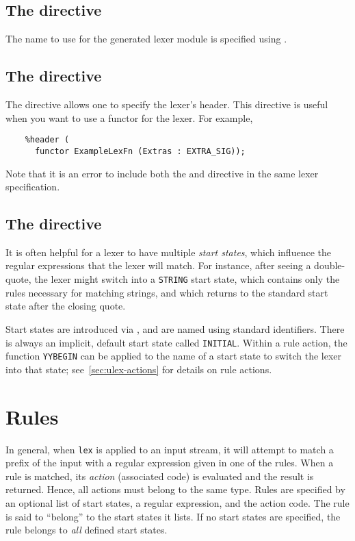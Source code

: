 \subsection{The  directive}

The name to use for the generated lexer module is specified using .

\subsection{The  directive}
The  directive allows one to specify the lexer's header.
This directive is useful when you want to use a functor for the lexer.
For example,
\begin{verbatim}
    %header (
      functor ExampleLexFn (Extras : EXTRA_SIG));
\end{verbatim}%
Note that it is an error to include both the  and  directive in the
same lexer specification.

\subsection{The  directive}
\label{sec:start-states}

It is often helpful for a lexer to have multiple \emph{start states}, which influence the regular expressions that the lexer will match.  For instance, after seeing a double-quote, the lexer might switch into a \texttt{STRING} start state, which contains only the rules necessary for matching strings, and which returns to the standard start state after the closing quote.

Start states are introduced via , and are named using standard identifiers.  There is always an implicit, default start state called \texttt{INITIAL}.  Within a rule action, the function \texttt{YYBEGIN} can be applied to the name of a start state to switch the lexer into that state; see~\ref{sec:ulex-actions} for details on rule actions.

\section{Rules}\label{sec:ulex-rules}

In general, when \texttt{lex} is applied to an input stream, it will attempt to match a prefix of the input with a regular expression given in one of the rules.  When a rule is matched, its \emph{action} (associated code) is evaluated and the result is returned.  Hence, all actions must belong to the same type.%
Rules are specified by an optional list of start states, a regular expression, and the action code.  The rule is said to ``belong'' to the start states it lists.  If no start states are specified, the rule belongs to \emph{all} defined start states.

